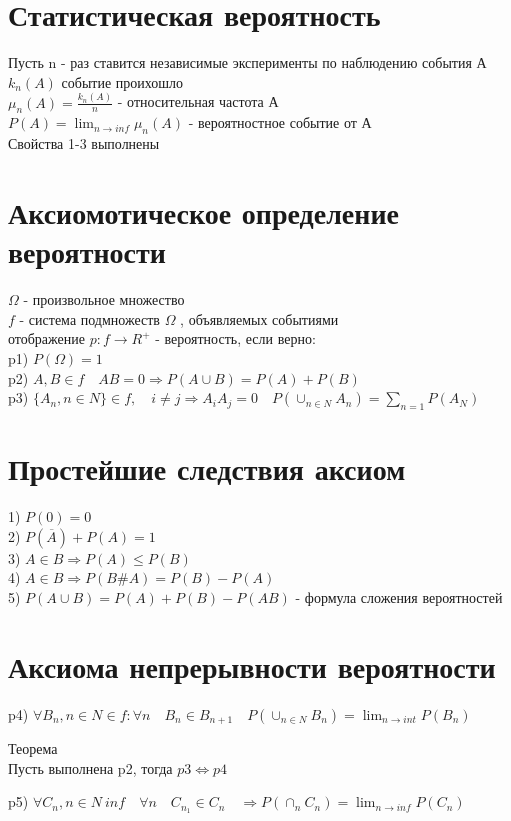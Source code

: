\documentclass[a4paper, 12pt]{article}
\begin{document}
\section{Статистическая вероятность}
Пусть n - раз ставится  независимые эксперименты по наблюдению события А\\
$ k_n(A) $  событие проихошло\\
$ \mu_n(A) = \frac{k_n(A)}{n} $ - относительная частота А\\
$ P(A) = \lim_{n\to inf} \mu_n(A)  $ - вероятностное событие от А\\
Свойства 1-3 выполнены\\
\section{Аксиомотическое определение вероятности}
$ \Omega $  - произвольное множество\\
$ f $ - система подмножеств $ \Omega $ , объявляемых событиями\\
отображение $ p:f\to R^+ $ - вероятность, если верно:\\
p1) 	$ P(\Omega) = 1 $  \\
p2) $ A,B \in f \quad AB = 0 \Rightarrow P(A\cup B) = P(A) + P(B) $ \\
p3) $ \{A_n, n \in N\}\in f, \quad i \neq j \Rightarrow A_i A_j = 0 \quad P(\cup_{n\in N}A_n) = \sum_{n=1}^{}P(A_N)$ \\
\section{Простейшие следствия аксиом}
1) $ P(0) = 0 $ \\
2) $ P(\overline{A})+P(A) = 1 $\\ 
3) $ A \in B \Rightarrow P(A) \leq P(B) $\\ 
4) $ A \in B \Rightarrow P(B \#A) = P(B) - P(A) $ \\
5) $ P(A\cup B) = P(A) + P(B) - P(AB) $ - формула сложения вероятностей\\
\section{Аксиома непрерывности вероятности}
p4) $ \forall {B_n , n\in N } \in f: \forall n \quad B_n \in B_{n+1} \quad P(\cup_{n\in N}B_n)= \lim_{n\to int} P(B_n)  $\\
\begin{mdframed}[backgroundcolor=blue!20] 
        Теорема\\
        Пусть выполнена p2, тогда $ p3 \Leftrightarrow p4 $ 
     \end{mdframed}

p5) $ \forall {C_n , n\in N} \ in f \quad  \forall n \quad  C_{n_1} \in C_n \quad  \Rightarrow P(\cap_n C_n) = \lim_{n\to inf} P(C_n) $ 
\end{document}
